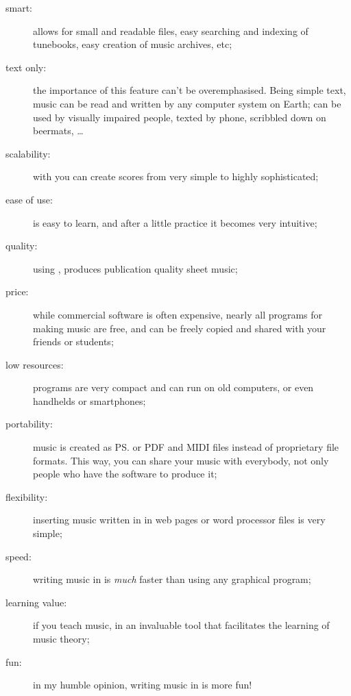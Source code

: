 \documentclass[a4paper,fullpage,12pt]{book}
\begin{document}
\begin{description}
  
  \item [smart:] \ABC{} allows for small and readable files, ea\-sy
  se\-ar\-ching and indexing of tunebooks, easy creation of music
  archives, etc;
  
  \item [text only:] the importance of this feature can't be
  overemphasised. Being simple text, \ABC{} music can be read and
  written by any computer system on Earth; can be used by visually
  impaired people, texted by phone, scribbled down on beermats,
  {\ldots}
  
  \item [scalability:] with \ABC{} you can create scores from very
  simple to highly sophisticated;
  
  \item [ease of use:] \ABC{} is easy to learn, and after a little
  practice it becomes very intuitive;
  
  \item [quality:] using \abcm, \ABC{} produces publication quality
  sheet music;
  
  \item [price:] while commercial software is often expensive, nearly
  all programs for making \ABC{} music are free, and can be freely
  copied and shared with your friends or students;
  
  \item [low resources:] \ABC{} programs are very compact and can run
  on old computers, or even handhelds or smartphones;
  
  \item [portability:] music is created as \ps{} or PDF and
  MIDI files instead of proprietary file formats. This way, you can
  share your music with everybody, not only people who have the
  software to produce it;
  
  \item [flexibility:] inserting music written in \ABC{} in web pages
  or word processor files is very simple;
  
  \item [speed:] writing music in \ABC{} is \emph{much} faster than
  using any graphical program;
  
  \item [learning value:] if you teach music, \ABC{} in an invaluable
  tool that facilitates the learning of music theory;
  
  \item [fun:] in my humble opinion, writing music in \ABC{} is more
  fun!
  
\end{description}
\end{document}
